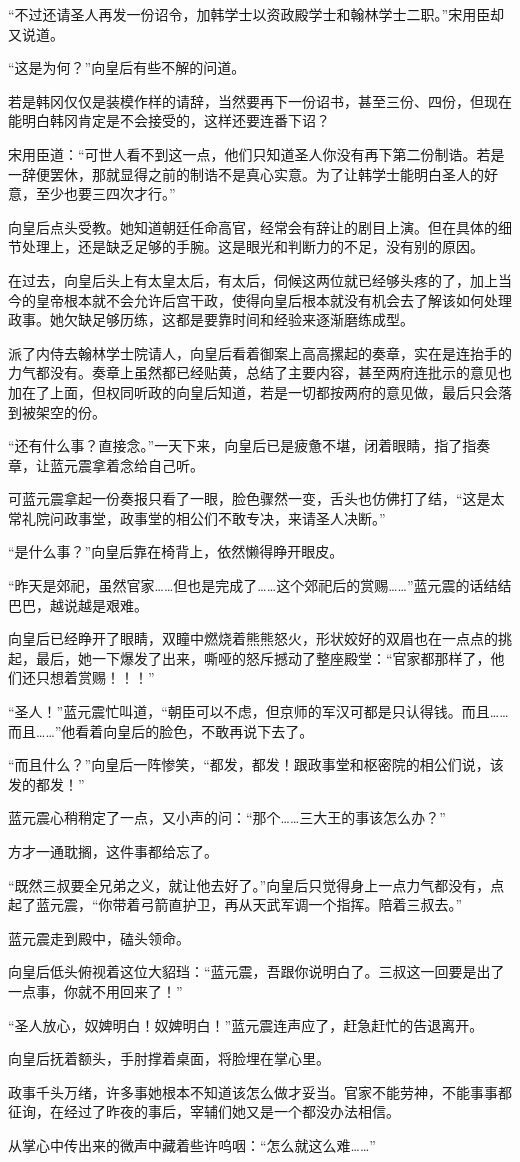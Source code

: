 “不过还请圣人再发一份诏令，加韩学士以资政殿学士和翰林学士二职。”宋用臣却又说道。

“这是为何？”向皇后有些不解的问道。

若是韩冈仅仅是装模作样的请辞，当然要再下一份诏书，甚至三份、四份，但现在能明白韩冈肯定是不会接受的，这样还要连番下诏？

宋用臣道：“可世人看不到这一点，他们只知道圣人你没有再下第二份制诰。若是一辞便罢休，那就显得之前的制诰不是真心实意。为了让韩学士能明白圣人的好意，至少也要三四次才行。”

向皇后点头受教。她知道朝廷任命高官，经常会有辞让的剧目上演。但在具体的细节处理上，还是缺乏足够的手腕。这是眼光和判断力的不足，没有别的原因。

在过去，向皇后头上有太皇太后，有太后，伺候这两位就已经够头疼的了，加上当今的皇帝根本就不会允许后宫干政，使得向皇后根本就没有机会去了解该如何处理政事。她欠缺足够历练，这都是要靠时间和经验来逐渐磨练成型。

派了内侍去翰林学士院请人，向皇后看着御案上高高摞起的奏章，实在是连抬手的力气都没有。奏章上虽然都已经贴黄，总结了主要内容，甚至两府连批示的意见也加在了上面，但权同听政的向皇后知道，若是一切都按两府的意见做，最后只会落到被架空的份。

“还有什么事？直接念。”一天下来，向皇后已是疲惫不堪，闭着眼睛，指了指奏章，让蓝元震拿着念给自己听。

可蓝元震拿起一份奏报只看了一眼，脸色骤然一变，舌头也仿佛打了结，“这是太常礼院问政事堂，政事堂的相公们不敢专决，来请圣人决断。”

“是什么事？”向皇后靠在椅背上，依然懒得睁开眼皮。

“昨天是郊祀，虽然官家……但也是完成了……这个郊祀后的赏赐……”蓝元震的话结结巴巴，越说越是艰难。

向皇后已经睁开了眼睛，双瞳中燃烧着熊熊怒火，形状姣好的双眉也在一点点的挑起，最后，她一下爆发了出来，嘶哑的怒斥撼动了整座殿堂：“官家都那样了，他们还只想着赏赐！！！”

“圣人！”蓝元震忙叫道，“朝臣可以不虑，但京师的军汉可都是只认得钱。而且……而且……”他看着向皇后的脸色，不敢再说下去了。

“而且什么？”向皇后一阵惨笑，“都发，都发！跟政事堂和枢密院的相公们说，该发的都发！”

蓝元震心稍稍定了一点，又小声的问：“那个……三大王的事该怎么办？”

方才一通耽搁，这件事都给忘了。

“既然三叔要全兄弟之义，就让他去好了。”向皇后只觉得身上一点力气都没有，点起了蓝元震，“你带着弓箭直护卫，再从天武军调一个指挥。陪着三叔去。”

蓝元震走到殿中，磕头领命。

向皇后低头俯视着这位大貂珰：“蓝元震，吾跟你说明白了。三叔这一回要是出了一点事，你就不用回来了！”

“圣人放心，奴婢明白！奴婢明白！”蓝元震连声应了，赶急赶忙的告退离开。

向皇后抚着额头，手肘撑着桌面，将脸埋在掌心里。

政事千头万绪，许多事她根本不知道该怎么做才妥当。官家不能劳神，不能事事都征询，在经过了昨夜的事后，宰辅们她又是一个都没办法相信。

从掌心中传出来的微声中藏着些许呜咽：“怎么就这么难……”
